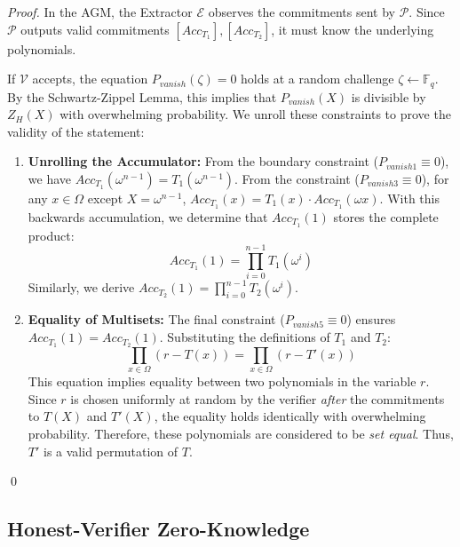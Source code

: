 \begin{proof}
    In the AGM, the Extractor $\mathcal{E}$ observes the commitments sent by ${\mathcal{P}}$. Since ${\mathcal{P}}$ outputs valid commitments $[Acc_{T_1}], [Acc_{T_2}]$, it must know the underlying polynomials.
    
    If $\mathcal{V}$ accepts, the equation $P_{vanish}(\zeta) = 0$ holds at a random challenge $\zeta \leftarrow \mathbb{F}_q$. By the Schwartz-Zippel Lemma, this implies that $P_{vanish}(X)$ is divisible by $Z_H(X)$ with overwhelming probability. 
    We unroll these constraints to prove the validity of the statement:

    \begin{enumerate}
        \item \textbf{Unrolling the Accumulator:}
        From the boundary constraint ($P_{vanish1} \equiv 0$), we have $Acc_{T_1}(\omega^{n-1}) = T_1(\omega^{n-1})$.
        From the constraint ($P_{vanish3} \equiv 0$), for any $x \in \Omega$ except $X= \omega^{n-1}$, $Acc_{T_1}(x) = T_1(x) \cdot Acc_{T_1}(\omega x)$.
        With this backwards accumulation, we determine that $Acc_{T_1}(1)$ stores the complete product:
        \begin{equation}
            Acc_{T_1}(1) = \prod_{i=0}^{n-1} T_1(\omega^i)
        \end{equation}
        Similarly, we derive $Acc_{T_2}(1) = \prod_{i=0}^{n-1} T_2(\omega^i)$.

        \item \textbf{Equality of Multisets:}
        The final constraint ($P_{vanish5} \equiv 0$) ensures $Acc_{T_1}(1) = Acc_{T_2}(1)$. Substituting the definitions of $T_1$ and $T_2$:
        \begin{equation}
            \prod_{x \in \Omega} (r - T(x)) = \prod_{x \in \Omega} (r - T'(x))
        \end{equation}
        This equation implies equality between two polynomials in the variable $r$. Since $r$ is chosen uniformly at random by the verifier \emph{after} the commitments to $T(X)$ and $T'(X)$, the equality holds identically with overwhelming probability. 
        Therefore, these polynomials are considered to be \emph{set equal}. Thus, $T'$ is a valid permutation of $T$.
    \end{enumerate}
    \qed
\end{proof}

\subsection{Honest-Verifier Zero-Knowledge}

